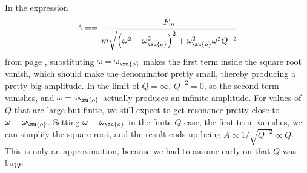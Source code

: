 In the expression \begin{equation*} A = =
\frac{F_m}{m\sqrt{\left(\omega^2-\omega_\zu{o}^2\right)^2
+\omega_\zu{o}^2\omega^2Q^{-2}}} \end{equation*} from page
\pageref{resonance-amplitude}, substituting $\omega=\omega_\zu{o}$
makes the first term inside the square root vanish, which should make
the denominator pretty small, thereby producing a pretty big
amplitude. In the limit of $Q=\infty$, $Q^{-2}=0$, so the second term
vanishes, and $\omega=\omega_\zu{o}$ actually produces an infinite
amplitude. For values of $Q$ that are large but finite, we still
expect to get resonance pretty close to $\omega=\omega_\zu{o}$.
Setting $\omega=\omega_\zu{o}$ in the finite-$Q$ case, the first term
vanishes, we can simplify the square root, and the result ends up
being $A\propto 1/\sqrt{Q^{-2}}\propto Q$. This is only an
approximation, because we had to assume early on that $Q$ was large.
